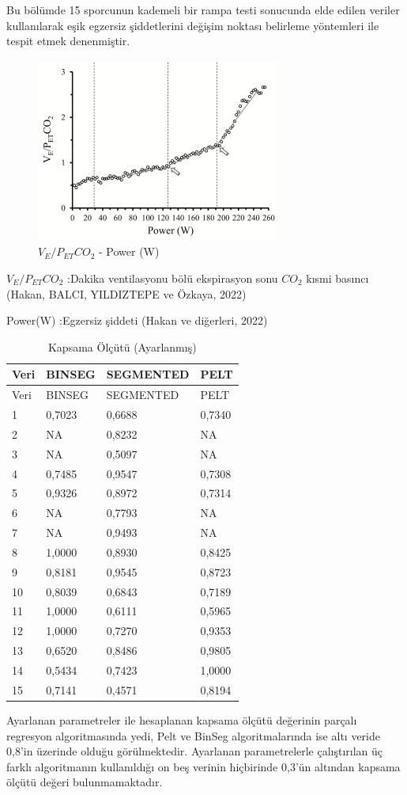 \documentclass[12pt,twoside]{deuthesis}
\begin{document}
Bu bölümde 15 sporcunun kademeli bir rampa testi sonucunda elde edilen veriler kullanılarak eşik egzersiz şiddetlerini değişim noktası belirleme yöntemleri ile tespit etmek denenmiştir.

\begin{figure}
\includegraphics[width=302px,height=228px]{figure/vepetco2} \caption{$V_E/P_{ET}CO_2$ - Power (W)}\label{fig:unnamed-chunk-5}
\end{figure}

\(V_E/P_{ET}CO_2\) :Dakika ventilasyonu bölü ekspirasyon sonu \(CO_2\) kısmi basıncı (Hakan, BALCI, YILDIZTEPE ve Özkaya, 2022)

Power(W) :Egzersiz şiddeti (Hakan ve diğerleri, 2022)

\begin{longtable}[]{@{}llll@{}}
\caption{\label{tab:nvar6} Kapsama Ölçütü (Ayarlanmış)}\tabularnewline
\toprule
Veri & BINSEG & SEGMENTED & PELT\tabularnewline
\midrule
\endfirsthead
\toprule
Veri & BINSEG & SEGMENTED & PELT\tabularnewline
\midrule
\endhead
1 & 0,7023 & 0,6688 & 0,7340\tabularnewline
2 & NA & 0,8232 & NA\tabularnewline
3 & NA & 0,5097 & NA\tabularnewline
4 & 0,7485 & 0,9547 & 0,7308\tabularnewline
5 & 0,9326 & 0,8972 & 0,7314\tabularnewline
6 & NA & 0,7793 & NA\tabularnewline
7 & NA & 0,9493 & NA\tabularnewline
8 & 1,0000 & 0,8930 & 0,8425\tabularnewline
9 & 0,8181 & 0,9545 & 0,8723\tabularnewline
10 & 0,8039 & 0,6843 & 0,7189\tabularnewline
11 & 1,0000 & 0,6111 & 0,5965\tabularnewline
12 & 1,0000 & 0,7270 & 0,9353\tabularnewline
13 & 0,6520 & 0,8486 & 0,9805\tabularnewline
14 & 0,5434 & 0,7423 & 1,0000\tabularnewline
15 & 0,7141 & 0,4571 & 0,8194\tabularnewline
\bottomrule
\end{longtable}

Ayarlanan parametreler ile hesaplanan kapsama ölçütü değerinin parçalı regresyon algoritmasında yedi, Pelt ve BinSeg algoritmalarında ise altı veride 0,8'in üzerinde olduğu görülmektedir.
Ayarlanan parametrelerle çalıştırılan üç farklı algoritmanın kullanıldığı on beş verinin hiçbirinde 0,3'ün altından kapsama ölçütü değeri bulunmamaktadır.
\end{document}
